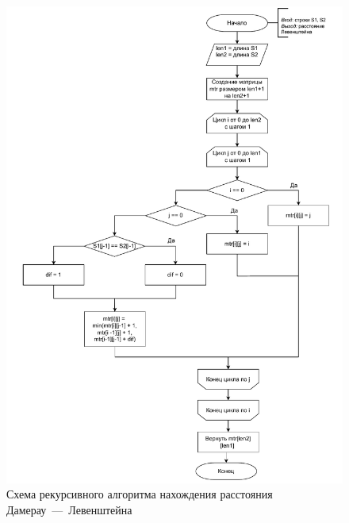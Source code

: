 \begin{figure}[h]
	\centering
	\includegraphics[height=0.9\textheight, page=3]{img/algorithms.pdf}
	\caption{Схема рекурсивного алгоритма нахождения расстояния Дамерау~---~Левенштейна}
	\label{fig:DLrec}
\end{figure}

\clearpage

